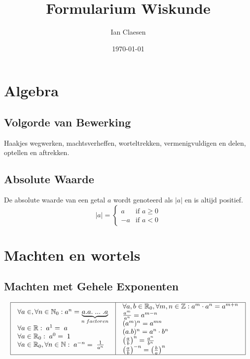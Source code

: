 \documentclass[a5paper]{article}
\begin{document}
\title{Formularium Wiskunde}
\author{Ian Claesen}
\date{\today}
\maketitle

\scriptsize
\tableofcontents

\newpage
\normalsize

\section{Algebra}
\subsection{Volgorde van Bewerking}
Haakjes wegwerken, machtsverheffen, worteltrekken, vermenigvuldigen en delen, optellen en aftrekken.

\subsection{Absolute Waarde}
De absolute waarde van een getal $a$ wordt genoteerd als $|a|$ en is altijd positief.
\[
|a| = \begin{cases} 
a & \text{if } a \geq 0 \\
-a & \text{if } a < 0 
\end{cases}\]

\section{Machten en wortels}
\subsection{Machten met Gehele Exponenten}
\renewcommand{\arraystretch}{1.5} %

\[
\begin{array}{|c|c|}
\hline
\begin{array}{l}
\forall a \in ,\forall n \in {\mathbb{N}_0}:{a^n} = \underbrace {a.a.\;...\;.a}_{n\;factoren}\\
\forall a \in {\mathbb{R}}:\;{a^1} = \;a\\
\forall a \in {\mathbb{R}_0}:\;{a^0} = \;1\\
\forall a \in {\mathbb{R}_0},\forall n \in {\mathbb{N}}:\;{a^{ - n}} = \;\frac{1}{{{a^n}}}
\end{array} & \begin{array}{l}
\forall a,b \in {\mathbb{R}_0},\forall m,n \in {\mathbb{Z}}:{a^m} \cdot {a^n} = {a^{m + n}}\\
\frac{{{a^m}}}{{{a^n}}} = {a^{m - n}}\\
{({a^m})^n} = {a^{mn}}\\
{(a.b)^n} = {a^n} \cdot {b^n}\\
{\left( {\frac{a}{b}} \right)^n} = \frac{{{a^n}}}{{{b^n}}}\\
{\left( {\frac{a}{b}} \right)^{ - n}} = {\left( {\frac{b}{a}} \right)^n}
\end{array} \\ 
\hline
\end{array}
\]
\end{document}
